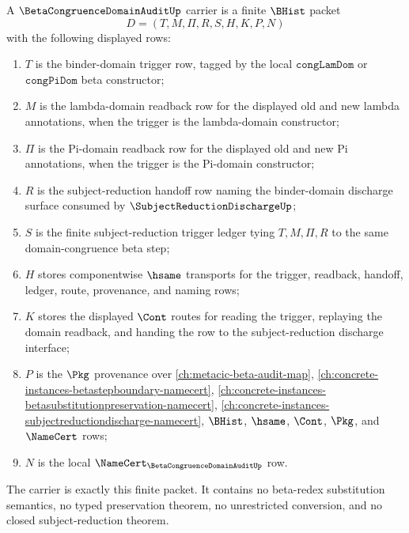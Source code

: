 \begin{definition}
\label{def:beta-congruence-domain-audit-carrier}
A $\BetaCongruenceDomainAuditUp$ carrier is a finite $\BHist$ packet
$$
D=(T,M,\Pi,R,S,H,K,P,N)
$$
with the following displayed rows:
\begin{enumerate}
\item $T$ is the binder-domain trigger row, tagged by the local $\texttt{congLamDom}$ or $\texttt{congPiDom}$ beta constructor;
\item $M$ is the lambda-domain readback row for the displayed old and new lambda annotations, when the trigger is the lambda-domain constructor;
\item $\Pi$ is the Pi-domain readback row for the displayed old and new Pi annotations, when the trigger is the Pi-domain constructor;
\item $R$ is the subject-reduction handoff row naming the binder-domain discharge surface consumed by $\SubjectReductionDischargeUp$;
\item $S$ is the finite subject-reduction trigger ledger tying $T,M,\Pi,R$ to the same domain-congruence beta step;
\item $H$ stores componentwise $\hsame$ transports for the trigger, readback, handoff, ledger, route, provenance, and naming rows;
\item $K$ stores the displayed $\Cont$ routes for reading the trigger, replaying the domain readback, and handing the row to the subject-reduction discharge interface;
\item $P$ is the $\Pkg$ provenance over \autoref{ch:metacic-beta-audit-map}, \autoref{ch:concrete-instances-betastepboundary-namecert}, \autoref{ch:concrete-instances-betasubstitutionpreservation-namecert}, \autoref{ch:concrete-instances-subjectreductiondischarge-namecert}, $\BHist$, $\hsame$, $\Cont$, $\Pkg$, and $\NameCert$ rows;
\item $N$ is the local $\NameCert_{\BetaCongruenceDomainAuditUp}$ row.
\end{enumerate}
The carrier is exactly this finite packet. It contains no beta-redex substitution semantics, no typed preservation theorem, no unrestricted conversion, and no closed subject-reduction theorem.
\end{definition}

